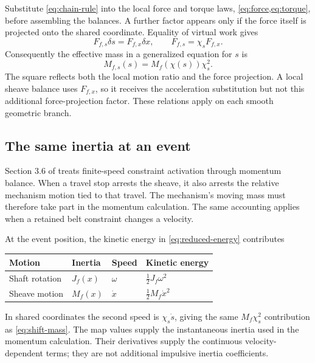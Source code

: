 \documentclass[11pt,letterpaper]{article}
\numberwithin{equation}{section}
\newcommand{\half}{\tfrac12}
\newcommand{\source}{\cite{formulation}}
\begin{document}
Substitute \cref{eq:chain-rule} into the local force and torque laws, \cref{eq:force,eq:torque}, before assembling the balances. A further factor appears only if the force itself is projected onto the shared coordinate. Equality of virtual work gives
\begin{equation}
  F_{f,s}\delta s=F_{f,x}\delta x,
  \qquad F_{f,s}=\chi_sF_{f,x}.
  \label{eq:shared-force}
\end{equation}
Consequently the effective mass in a generalized equation for $s$ is
\begin{equation}
  M_{f,s}(s)=M_f(\chi(s))\chi_s^2.
  \label{eq:shift-mass}
\end{equation}
The square reflects both the local motion ratio and the force projection. A local sheave balance uses $F_{f,x}$, so it receives the acceleration substitution but not this additional force-projection factor. These relations apply on each smooth geometric branch.

\subsection{The same inertia at an event}
\label{sec:events}

Section 3.6 of \source{} treats finite-speed constraint activation through momentum balance. When a travel stop arrests the sheave, it also arrests the relative mechanism motion tied to that travel. The mechanism's moving mass must therefore take part in the momentum calculation. The same accounting applies when a retained belt constraint changes a velocity.

At the event position, the kinetic energy in \cref{eq:reduced-energy} contributes
\begin{center}
\begin{tabular}{@{}llll@{}}
\toprule
Motion & Inertia & Speed & Kinetic energy\\
\midrule
Shaft rotation & $J_f(x)$ & $\omega$ & $\half J_f\omega^2$\\
Sheave motion & $M_f(x)$ & $\dot x$ & $\half M_f\dot x^2$\\
\bottomrule
\end{tabular}
\end{center}
In shared coordinates the second speed is $\chi_s\dot s$, giving the same $M_f\chi_s^2$ contribution as \cref{eq:shift-mass}. The map values supply the instantaneous inertia used in the momentum calculation. Their derivatives supply the continuous velocity-dependent terms; they are not additional impulsive inertia coefficients.
\end{document}
